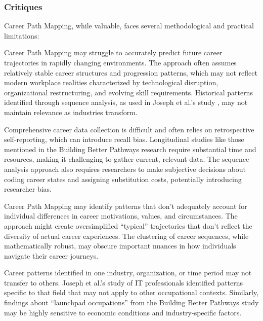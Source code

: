 \documentclass[../main.tex]{subfiles}
\begin{document}
\subsubsection{Critiques}
Career Path Mapping, while valuable, faces several methodological and practical limitations:

Career Path Mapping may struggle to accurately predict future career trajectories in rapidly changing environments. The approach often assumes relatively stable career structures and progression patterns, which may not reflect modern workplace realities characterized by technological disruption, organizational restructuring, and evolving skill requirements. Historical patterns identified through sequence analysis, as used in Joseph et al.'s study \parencite{joseph2012}, may not maintain relevance as industries transform.

Comprehensive career data collection is difficult and often relies on retrospective self-reporting, which can introduce recall bias. Longitudinal studies like those mentioned in the Building Better Pathways research \parencite{workforcegps2023} require substantial time and resources, making it challenging to gather current, relevant data. The sequence analysis approach also requires researchers to make subjective decisions about coding career states and assigning substitution costs, potentially introducing researcher bias.

Career Path Mapping may identify patterns that don't adequately account for individual differences in career motivations, values, and circumstances. The approach might create oversimplified ``typical'' trajectories that don't reflect the diversity of actual career experiences. The clustering of career sequences, while mathematically robust, may obscure important nuances in how individuals navigate their career journeys.

Career patterns identified in one industry, organization, or time period may not transfer to others. Joseph et al.'s study of IT professionals \parencite{joseph2012} identified patterns specific to that field that may not apply to other occupational contexts. Similarly, findings about ``launchpad occupations'' from the Building Better Pathways study \parencite{workforcegps2023} may be highly sensitive to economic conditions and industry-specific factors.
\end{document}

